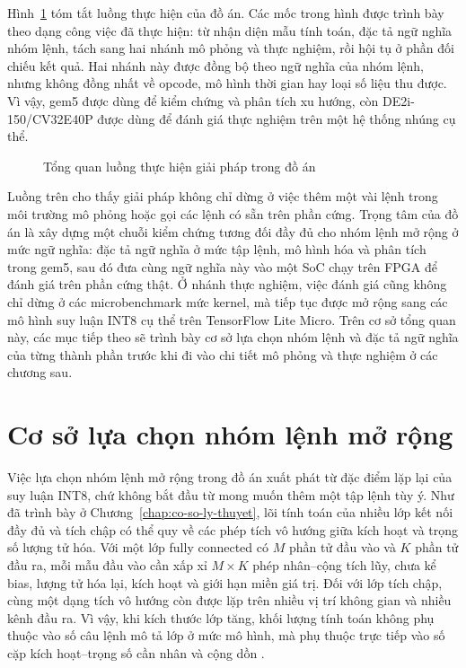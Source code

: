 \documentclass[../DoAn.tex]{subfiles}
\begin{document}
Hình~\ref{fig:solution-overview} tóm tắt luồng thực hiện của đồ án. Các mốc trong hình được trình bày theo dạng công việc đã thực hiện: từ nhận diện mẫu tính toán, đặc tả ngữ nghĩa nhóm lệnh, tách sang hai nhánh mô phỏng và thực nghiệm, rồi hội tụ ở phần đối chiếu kết quả. Hai nhánh này được đồng bộ theo ngữ nghĩa của nhóm lệnh, nhưng không đồng nhất về opcode, mô hình thời gian hay loại số liệu thu được. Vì vậy, gem5 được dùng để kiểm chứng và phân tích xu hướng, còn DE2i-150/CV32E40P được dùng để đánh giá thực nghiệm trên một hệ thống nhúng cụ thể.

\begin{figure}[H]
    \centering
    
    \caption{Tổng quan luồng thực hiện giải pháp trong đồ án}
    \label{fig:solution-overview}
\end{figure}

Luồng trên cho thấy giải pháp không chỉ dừng ở việc thêm một vài lệnh trong môi trường mô phỏng hoặc gọi các lệnh có sẵn trên phần cứng. Trọng tâm của đồ án là xây dựng một chuỗi kiểm chứng tương đối đầy đủ cho nhóm lệnh mở rộng ở mức ngữ nghĩa: đặc tả ngữ nghĩa ở mức tập lệnh, mô hình hóa và phân tích trong gem5, sau đó đưa cùng ngữ nghĩa này vào một SoC chạy trên FPGA để đánh giá trên phần cứng thật. Ở nhánh thực nghiệm, việc đánh giá cũng không chỉ dừng ở các microbenchmark mức kernel, mà tiếp tục được mở rộng sang các mô hình suy luận INT8 cụ thể trên TensorFlow Lite Micro. Trên cơ sở tổng quan này, các mục tiếp theo sẽ trình bày cơ sở lựa chọn nhóm lệnh và đặc tả ngữ nghĩa của từng thành phần trước khi đi vào chi tiết mô phỏng và thực nghiệm ở các chương sau.

\section{Cơ sở lựa chọn nhóm lệnh mở rộng}
\label{sec:co-so-lua-chon-nhom-lenh-mo-rong}

Việc lựa chọn nhóm lệnh mở rộng trong đồ án xuất phát từ đặc điểm lặp lại của suy luận INT8, chứ không bắt đầu từ mong muốn thêm một tập lệnh tùy ý. Như đã trình bày ở Chương~\ref{chap:co-so-ly-thuyet}, lõi tính toán của nhiều lớp kết nối đầy đủ và tích chập có thể quy về các phép tích vô hướng giữa kích hoạt và trọng số lượng tử hóa. Với một lớp fully connected có \(M\) phần tử đầu vào và \(K\) phần tử đầu ra, mỗi mẫu đầu vào cần xấp xỉ \(M \times K\) phép nhân--cộng tích lũy, chưa kể bias, lượng tử hóa lại, kích hoạt và giới hạn miền giá trị. Đối với lớp tích chập, cùng một dạng tích vô hướng còn được lặp trên nhiều vị trí không gian và nhiều kênh đầu ra. Vì vậy, khi kích thước lớp tăng, khối lượng tính toán không phụ thuộc vào số câu lệnh mô tả lớp ở mức mô hình, mà phụ thuộc trực tiếp vào số cặp kích hoạt--trọng số cần nhân và cộng dồn \cite{jacob2018integer,sze2017efficient}.
\end{document}

